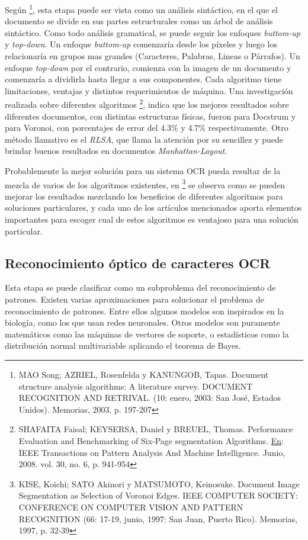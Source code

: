 \documentclass[a4paper, 11pt, oneside]{report}
\begin{document}
Según \footnote{MAO Song; AZRIEL, Rosenfelda y KANUNGOB, Tapas. Document structure analysis algorithms: A literature survey. DOCUMENT RECOGNITION AND RETRIVAL. (10: enero, 2003: San José, Estados Unidos).  Memorias, 2003, p. 197-207}, esta etapa puede ser vista como un análisis sintáctico, en el que el documento se divide en sus partes estructurales como un árbol de análisis sintáctico. Como todo análisis gramatical, se puede seguir los enfoques \textit{buttom-up} y \textit{top-down}. Un enfoque \textit{buttom-up} comenzaría desde los píxeles y luego los relacionaría en grupos mas grandes (Caracteres, Palabras, Lineas o Párrafos). Un enfoque \textit{top-down} por el contrario, comienza con la imagen de un documento y comenzaría a dividirla hasta llegar a sus componentes. Cada algoritmo tiene limitaciones, ventajas y distintos requerimientos de máquina. Una investigación realizada sobre diferentes algoritmos \footnote{SHAFAITA Faisal; KEYSERSA,  Daniel y BREUEL, Thomas. Performance Evaluation and Benchmarking of Six-Page segmentation Algorithms. \underline{En}: IEEE Transactions on Pattern Analysis And Machine Intelligence.  Junio, 2008. vol. 30, no. 6, p. 941-954}, indica que los mejores resultados sobre diferentes documentos, con distintas estructuras físicas, fueron para Docstrum y para Voronoi, con porcentajes de error del 4.3\% y 4.7\% respectivamente. Otro método	llamativo es el \textit{RLSA}, que llama  la atención por su sencillez y puede brindar buenos resultados en documentos \textit{Manhattan-Layout}. 

Probablemente la mejor solución para un sistema OCR pueda resultar de la mezcla de varios de los algoritmos existentes, en \footnote{KISE, Koichi; SATO Akinori y MATSUMOTO,  Keinosuke. Document Image Segmentation as Selection of Voronoi Edges. IEEE COMPUTER SOCIETY: CONFERENCE ON COMPUTER VISION AND PATTERN RECOGNITION (66: 17-19, junio, 1997: San Juan,  Puerto Rico). Memorias, 1997, p. 32-39} se observa como se pueden mejorar los resultados  mezclando los beneficios de diferentes algoritmos para soluciones particulares, y cada uno de los artículos mencionados aporta elementos importantes para escoger cual de estos algoritmos  es ventajoso para una solución particular.  

\subsection{Reconocimiento óptico de caracteres OCR}

Esta etapa se puede clasificar como un subproblema del reconocimiento de patrones. Existen varias aproximaciones para solucionar el problema de reconocimiento de patrones. Entre ellos algunos modelos son inspirados en la biología, como los que usan redes neuronales. Otros modelos son puramente matemáticos como las máquinas de vectores de soporte, o estadísticos como la distribución normal multivariable aplicando el teorema de Bayes.
\end{document}
